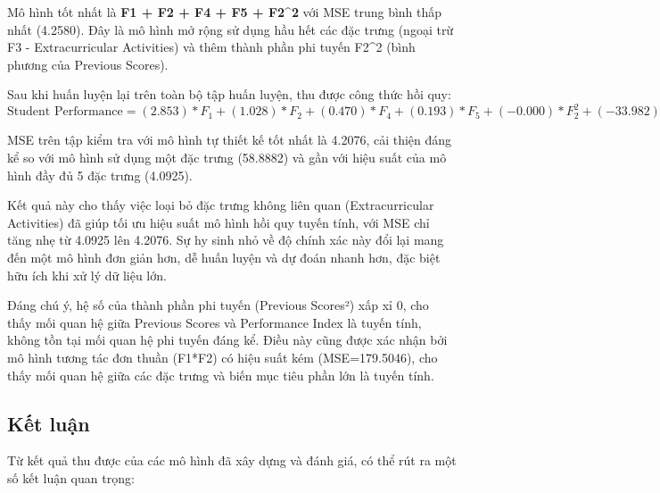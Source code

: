 Mô hình tốt nhất là \textbf{F1 + F2 + F4 + F5 + F2\^{}2} với MSE trung bình thấp nhất (4.2580). Đây là mô hình mở rộng sử dụng hầu hết các đặc trưng (ngoại trừ F3 - Extracurricular Activities) và thêm thành phần phi tuyến F2\^{}2 (bình phương của Previous Scores).

Sau khi huấn luyện lại trên toàn bộ tập huấn luyện, thu được công thức hồi quy:
$$\text{Student Performance} = (2.853)*F_1 + (1.028)*F_2 + (0.470)*F_4 + (0.193)*F_5 + (-0.000)*F_2^2 + (-33.982)$$

MSE trên tập kiểm tra với mô hình tự thiết kế tốt nhất là 4.2076, cải thiện đáng kể so với mô hình sử dụng một đặc trưng (58.8882) và gần với hiệu suất của mô hình đầy đủ 5 đặc trưng (4.0925).

Kết quả này cho thấy việc loại bỏ đặc trưng không liên quan (Extracurricular Activities) đã giúp tối ưu hiệu suất mô hình hồi quy tuyến tính, với MSE chỉ tăng nhẹ từ 4.0925 lên 4.2076. Sự hy sinh nhỏ về độ chính xác này đổi lại mang đến một mô hình đơn giản hơn, dễ huấn luyện và dự đoán nhanh hơn, đặc biệt hữu ích khi xử lý dữ liệu lớn.

Đáng chú ý, hệ số của thành phần phi tuyến (Previous Scores²) xấp xỉ 0, cho thấy mối quan hệ giữa Previous Scores và Performance Index là tuyến tính, không tồn tại mối quan hệ phi tuyến đáng kể. Điều này cũng được xác nhận bởi mô hình tương tác đơn thuần (F1*F2) có hiệu suất kém (MSE=179.5046), cho thấy mối quan hệ giữa các đặc trưng và biến mục tiêu phần lớn là tuyến tính.

\subsection{Kết luận}
Từ kết quả thu được của các mô hình đã xây dựng và đánh giá, có thể rút ra một số kết luận quan trọng:

